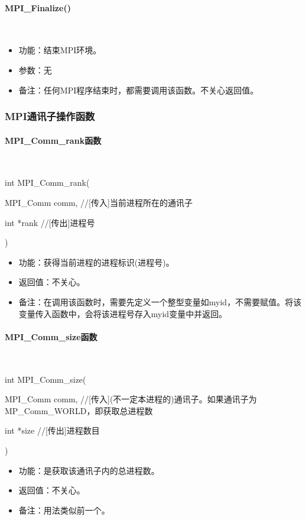 \documentclass[UTF8]{article}%
\begin{document}
\paragraph{MPI\_Finalize()}~{}

\begin{itemize}
    \item 功能：结束MPI环境。
    \item 参数：无
    \item 备注：任何MPI程序结束时，都需要调用该函数。不关心返回值。
\end{itemize}

\subsubsection{MPI通讯子操作函数}

\paragraph{MPI\_Comm\_rank函数}~{}

int MPI\_Comm\_rank(

    \qquad MPI\_Comm comm, //[传入]当前进程所在的通讯子

    \qquad int *rank //[传出]进程号

    ) 

\begin{itemize}
    \item 功能：获得当前进程的进程标识(进程号)。
    \item 返回值：不关心。
    \item 备注：在调用该函数时，需要先定义一个整型变量如myid，不需要赋值。将该变量传入函数中，会将该进程号存入myid变量中并返回。
\end{itemize}

\paragraph{MPI\_Comm\_size函数}~{}

int MPI\_Comm\_size(
    
    \qquad MPI\_Comm comm, //[传入](不一定本进程的)通讯子。如果通讯子为MP\_Comm\_WORLD，即获取总进程数

    \qquad int *size //[传出]进程数目
    
    ) 

\begin{itemize}
    \item 功能：是获取该通讯子内的总进程数。
    \item 返回值：不关心。
    \item 备注：用法类似前一个。
\end{itemize}
\end{document}
